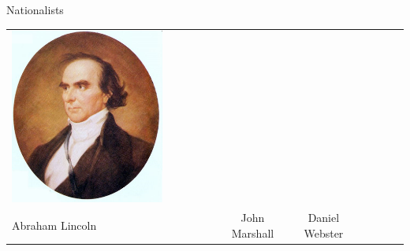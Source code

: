 \begin{frame}{Nationalists}
\begin{table}[h]
\begin{tabular}{lcccccc}
    \includegraphics[width=0.75\textwidth,height=.3\textheight,keepaspectratio=true]{img/daniel-webster-portrait.png} \\
    Abraham Lincoln &
    John Marshall &
    Daniel Webster &
\end{tabular}
\end{table}
\end{frame}

